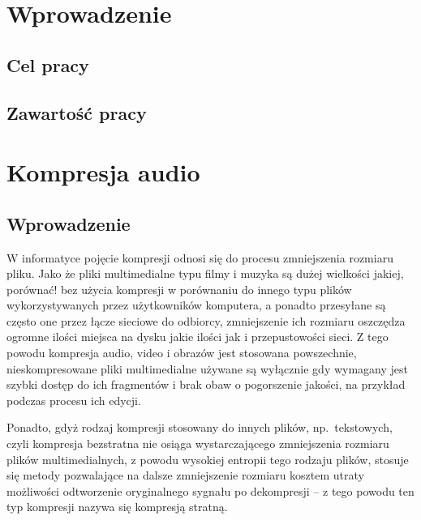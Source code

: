 \documentclass[pl,12pt]{aghdpl}
\author{Szymon Piotr Mikulicz}
\date{\today}
\let\Oldchapter\chapter%
\renewcommand{\chapter}{\FloatBarrier\Oldchapter}
\let\Oldsection\section%
\renewcommand{\section}{\FloatBarrier\Oldsection}
\begin{document}
\titlepages{}

{%
        \fancyhf{}
        \renewcommand{\headrulewidth}{0pt}
        \renewcommand{\footrulewidth}{0pt}
}

\setcounter{tocdepth}{2}
{\singlespacing\tableofcontents}
\clearpage

\chapter{Wprowadzenie}
\section{Cel pracy}
\section{Zawartość pracy}
\chapter{Kompresja audio}
\section{Wprowadzenie}
W informatyce pojęcie kompresji odnosi się do procesu zmniejszenia rozmiaru
pliku. Jako że pliki multimedialne typu filmy i muzyka są dużej wielkości
{\color{red}jakiej, porównać!} bez użycia kompresji w porównaniu do innego typu
plików wykorzystywanych przez użytkowników komputera, a ponadto przesyłane są
często one przez łącze sieciowe do odbiorcy, zmniejszenie ich rozmiaru
oszczędza ogromne ilości miejsca na dysku {\color{red}jakie ilości} jak i
przepustowości sieci. Z tego powodu kompresja audio, video i obrazów jest
stosowana powszechnie, nieskompresowane pliki multimedialne używane są
wyłącznie gdy wymagany jest szybki dostęp do ich fragmentów i brak obaw o
pogorszenie jakości, na przykład podczas procesu ich edycji.

Ponadto, gdyż rodzaj kompresji stosowany do innych plików, np.\ tekstowych,
czyli kompresja bezstratna nie osiąga wystarczającego zmniejszenia rozmiaru
plików multimedialnych, z powodu wysokiej entropii tego rodzaju plików, stosuje
się metody pozwalające na dalsze zmniejszenie rozmiaru kosztem utraty
możliwości odtworzenie oryginalnego sygnału po dekompresji -- z tego powodu ten
typ kompresji nazywa się kompresją stratną.
\end{document}
